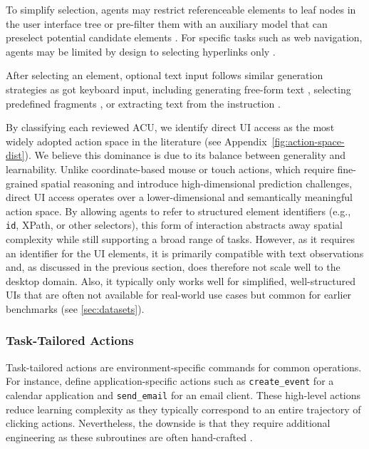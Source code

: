 To simplify selection, agents may restrict referenceable elements to leaf nodes in the user interface tree  or pre-filter them with an auxiliary model that can preselect potential candidate elements . For specific tasks such as web navigation, agents may be limited by design to selecting hyperlinks only \citep{zaheer_learning_2022, chen_webvln_2024}.

After selecting an element, optional text input follows similar generation strategies as got keyboard input, including generating free-form text , selecting predefined fragments , or extracting text from the instruction .

By classifying each reviewed ACU, we identify direct UI access as the most widely adopted action space in the literature (see Appendix~\cref{fig:action-space-dist}). We believe this dominance is due to its balance between generality and learnability. Unlike coordinate-based mouse or touch actions, which require fine-grained spatial reasoning and introduce high-dimensional prediction challenges, direct UI access operates over a lower-dimensional and semantically meaningful action space. By allowing agents to refer to structured element identifiers (e.g., \texttt{id}, XPath, or other selectors), this form of interaction abstracts away spatial complexity while still supporting a broad range of tasks.
However, as it requires an identifier for the UI elements, it is primarily compatible with text observations and, as discussed in the previous section, does therefore not scale well to the desktop domain.
Also, it typically only works well for simplified, well-structured UIs that are often not available for real-world use cases but common for earlier benchmarks (see \cref{sec:datasets}).


\subsubsection{Task-Tailored Actions}\label{sec:action_space_task}
Task-tailored actions are environment-specific commands for common operations.
For instance, \citet{wang_officebench_2024} define application-specific actions such as \texttt{create\_event} for a calendar application and \texttt{send\_email} for an email client.
These high-level actions reduce learning complexity as they typically correspond to an entire trajectory of clicking actions.
Nevertheless, the downside is that they require additional engineering as these subroutines are often hand-crafted .

